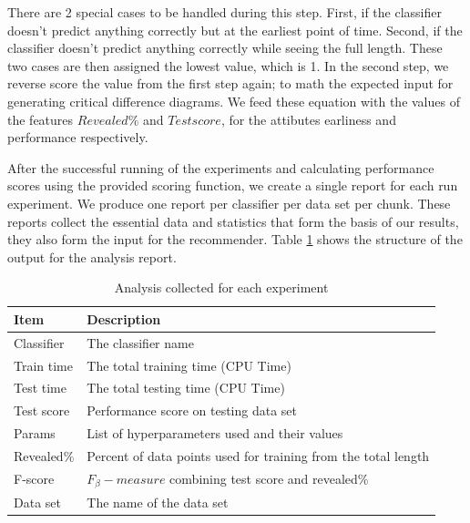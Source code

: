 There are 2 special cases to be handled during this step.
First, if the classifier doesn't predict anything correctly but at the earliest point of time.
Second, if the classifier doesn't predict anything correctly while seeing the full length.
These two cases are then assigned the lowest value, which is 1.
In the second step, we reverse score the value from the first step again; to math the expected input for generating critical difference diagrams.
We feed these equation with the values of the features $Revealed \%$ and $Test score$, for the attibutes earliness and performance respectively.

After the successful running of the experiments and calculating performance scores using the provided scoring function, we create a single report for each run experiment.
We produce one report per classifier per data set per chunk.
These reports collect the essential data and statistics that form the basis of our results, they also form the input for the recommender.
Table \ref{TableAnalysisReport} shows the structure of the output for the analysis report.

\begin{table}
  \setlength\extrarowheight{2pt} %
  \begin{tabularx}{\textwidth}{|X|X|}
  \hline
  \textbf{Item} & \textbf{Description} \\ \hline
    Classifier                 & The classifier name                                             \\ \hline
    Train time                 & The total training time (CPU Time)                              \\ \hline
    Test time                  & The total testing time (CPU Time)                               \\ \hline
    Test score                 & Performance score on testing data set                           \\ \hline
    Params                     & List of hyperparameters used and their values                   \\ \hline
    Revealed\%                 & Percent of data points used for training from the total length  \\ \hline
    F-score                    & $F_{\beta}-measure$ combining test score and revealed\%         \\ \hline
    Data set                   & The name of the data set                                        \\ \hline
  \end{tabularx}
  \caption{Analysis collected for each experiment}
  \label{TableAnalysisReport}
\end{table}

